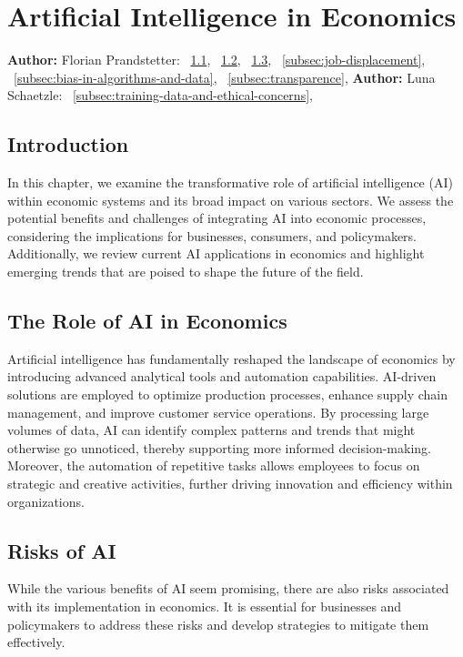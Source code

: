 \chapter{Artificial Intelligence in Economics}
\label{chap:Artificial_Intelligence_in_Economics}
\textbf{Author:} Florian Prandstetter: ~\ref{sec:introduction}, ~\ref{sec:role-of-ai-in-economics}, ~\ref{sec:risks-of-ai}, ~\ref{subsec:job-displacement}, ~\ref{subsec:bias-in-algorithms-and-data}, ~\ref{subsec:transparence}, 
\textbf{Author:} Luna Schaetzle: ~\ref{subsec:training-data-and-ethical-concerns},


\section{Introduction}
\label{sec:introduction}

In this chapter, we examine the transformative role of artificial intelligence (AI) within economic systems and its broad impact on various sectors. We assess the potential benefits and challenges of integrating AI into economic processes, considering the implications for businesses, consumers, and policymakers. Additionally, we review current AI applications in economics and highlight emerging trends that are poised to shape the future of the field.

\section{The Role of AI in Economics}
\label{sec:role-of-ai-in-economics}

Artificial intelligence has fundamentally reshaped the landscape of economics by introducing advanced analytical tools and automation capabilities. AI-driven solutions are employed to optimize production processes, enhance supply chain management, and improve customer service operations. By processing large volumes of data, AI can identify complex patterns and trends that might otherwise go unnoticed, thereby supporting more informed decision-making. Moreover, the automation of repetitive tasks allows employees to focus on strategic and creative activities, further driving innovation and efficiency within organizations.

\section{Risks of AI}
\label{sec:risks-of-ai}

While the various benefits of AI seem promising, there are also risks associated with its implementation in economics.
It is essential for businesses and policymakers to address these risks and develop strategies to mitigate them effectively.

